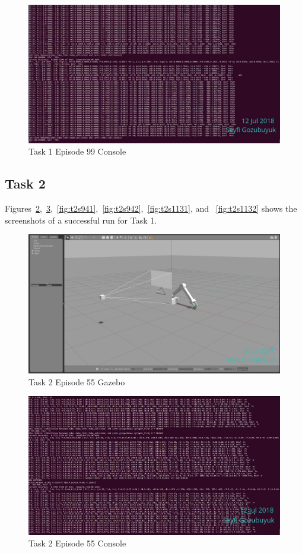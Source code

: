 \documentclass[10pt,journal,compsoc]{IEEEtran}
\begin{document}
\begin{figure}[thpb]
      \centering
      \includegraphics[width=\linewidth]{figures/Task1_Step99_2.png}
      \caption{Task 1 Episode 99 Console}
      \label{fig:t1s992}
\end{figure}
\subsection{Task 2}
Figures~\ref{fig:t2s551},~\ref{fig:t2s552},~\ref{fig:t2s941},~\ref{fig:t2s942},~\ref{fig:t2s1131}, and ~\ref{fig:t2s1132} shows the screenshots of a successful run for Task 1.
\begin{figure}[thpb]
      \centering
      \includegraphics[width=\linewidth]{figures/Task2_Step55_1.png}
      \caption{Task 2 Episode 55 Gazebo}
      \label{fig:t2s551}
\end{figure}

\begin{figure}[thpb]
      \centering
      \includegraphics[width=\linewidth]{figures/Task2_Step55_2.png}
      \caption{Task 2 Episode 55 Console}
      \label{fig:t2s552}
\end{figure}
\end{document}
